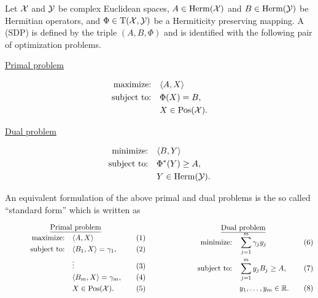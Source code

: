 Let $\mathcal{X}$ and $\mathcal{Y}$ be complex Euclidean spaces, $A\in\mathrm{Herm}(\mathcal{X})$ and $B\in\mathrm{Herm}(\mathcal{Y})$
be Hermitian operators, and $\Phi \in \mathrm{T}(\mathcal{X},\mathcal{Y})$ be a Hermiticity preserving mapping.
A  (SDP) is defined by the triple $(A,B,\Phi)$ and is identified with
the following pair of optimization problems.
\begin{center}
  \begin{minipage}{2in}
    \centerline{\underline{Primal problem}}\vspace{-7mm}
    \begin{align*}
      \text{maximize:}\quad & \langle A , X\rangle\\
      \text{subject to:}\quad & \Phi(X) = B,\\
      & X \in \mathrm{Pos}(\mathcal{X}).
    \end{align*}
  \end{minipage}
  \hspace*{1.5cm}
  \begin{minipage}{2.4in}
    \centerline{\underline{Dual problem}}\vspace{-7mm}
    \begin{align*}
      \text{minimize:}\quad & \langle B , Y\rangle\\
      \text{subject to:}\quad & \Phi^{\ast}(Y) \geq A,\\
      & Y\in\mathrm{Herm}(\mathcal{Y}).
    \end{align*}
  \end{minipage}
\end{center}
An equivalent formulation of the above primal and dual problems is the so called ``standard form'' which is written as
\begin{center} 
	\begin{equation} \label{sdp:standard-form}
  \begin{minipage}{2.6in}
    \centerline{\underline{Primal problem}}\vspace{-7mm}
    \begin{align*}
      \text{maximize:}\quad & \ip{A}{X} \\
      \text{subject to:}\quad & \ip{B_1}{X} = \gamma_1, \\
      & \vdots \\
      & \ip{B_m}{X} = \gamma_m, \\
      & X\in\Pos(\X).
    \end{align*}
  \end{minipage}
  \hspace*{13mm}
  \begin{minipage}{2.6in}
    \centerline{\underline{Dual problem}}\vspace{-7mm}
    \begin{align}
      \text{minimize:}\quad & \sum_{j = 1}^m \gamma_j y_j \nonumber \\
      \text{subject to:}\quad & \sum_{j=1}^m y_j B_j \geq A, \nonumber \\
      & y_1, \ldots, y_m \in \real. \nonumber
    \end{align}
  \end{minipage}
  \end{equation}
\end{center}

